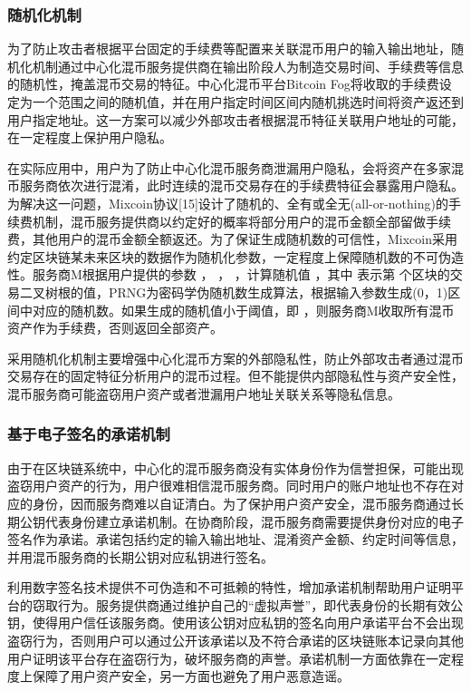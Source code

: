 \subsubsection{随机化机制}

为了防止攻击者根据平台固定的手续费等配置来关联混币用户的输入输出地址，随机化机制通过中心化混币服务提供商在输出阶段人为制造交易时间、手续费等信息的随机性，掩盖混币交易的特征。中心化混币平台Bitcoin Fog将收取的手续费设定为一个范围之间的随机值，并在用户指定时间区间内随机挑选时间将资产返还到用户指定地址。这一方案可以减少外部攻击者根据混币特征关联用户地址的可能，在一定程度上保护用户隐私。

在实际应用中，用户为了防止中心化混币服务商泄漏用户隐私，会将资产在多家混币服务商依次进行混淆，此时连续的混币交易存在的手续费特征会暴露用户隐私。为解决这一问题，Mixcoin协议[15]设计了随机的、全有或全无(all-or-nothing)的手续费机制，混币服务提供商以约定好的概率将部分用户的混币金额全部留做手续费，其他用户的混币金额全额返还。为了保证生成随机数的可信性，Mixcoin采用约定区块链某未来区块的数据作为随机化参数，一定程度上保障随机数的不可伪造性。服务商M根据用户提供的参数 ， ， ，计算随机值 ，其中 表示第 个区块的交易二叉树根的值，PRNG为密码学伪随机数生成算法，根据输入参数生成(0，1)区间中对应的随机数。如果生成的随机值小于阈值，即 ，则服务商M收取所有混币资产作为手续费，否则返回全部资产。

采用随机化机制主要增强中心化混币方案的外部隐私性，防止外部攻击者通过混币交易存在的固定特征分析用户的混币过程。但不能提供内部隐私性与资产安全性，混币服务商可能盗窃用户资产或者泄漏用户地址关联关系等隐私信息。

\subsubsection{基于电子签名的承诺机制}

由于在区块链系统中，中心化的混币服务商没有实体身份作为信誉担保，可能出现盗窃用户资产的行为，用户很难相信混币服务商。同时用户的账户地址也不存在对应的身份，因而服务商难以自证清白。为了保护用户资产安全，混币服务商通过长期公钥代表身份建立承诺机制。在协商阶段，混币服务商需要提供身份对应的电子签名作为承诺。承诺包括约定的输入输出地址、混淆资产金额、约定时间等信息，并用混币服务商的长期公钥对应私钥进行签名。
	
利用数字签名技术提供不可伪造和不可抵赖的特性，增加承诺机制帮助用户证明平台的窃取行为。服务提供商通过维护自己的“虚拟声誉”，即代表身份的长期有效公钥，使得用户信任该服务商。使用该公钥对应私钥的签名向用户承诺平台不会出现盗窃行为，否则用户可以通过公开该承诺以及不符合承诺的区块链账本记录向其他用户证明该平台存在盗窃行为，破坏服务商的声誉。承诺机制一方面依靠在一定程度上保障了用户资产安全，另一方面也避免了用户恶意造谣。

